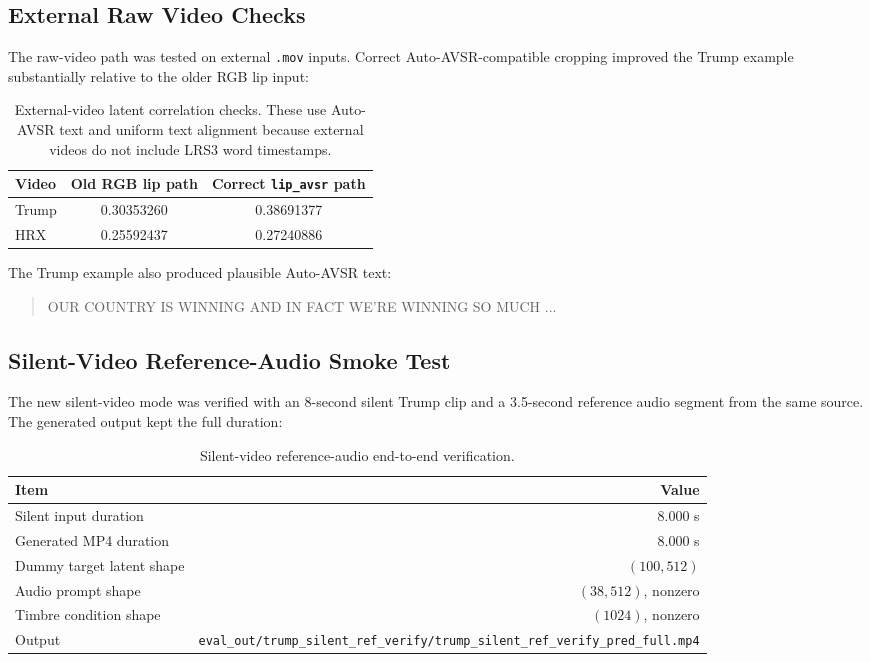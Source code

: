 \documentclass{article}
\begin{document}
\subsection{External Raw Video Checks}

The raw-video path was tested on external \texttt{.mov} inputs. Correct
Auto-AVSR-compatible cropping improved the Trump example substantially relative
to the older RGB lip input:
\begin{table}[h]
\centering
\small
\begin{tabular}{@{}lcc@{}}
\toprule
\textbf{Video} & \textbf{Old RGB lip path} & \textbf{Correct \texttt{lip\_avsr} path} \\
\midrule
Trump & 0.30353260 & 0.38691377 \\
HRX   & 0.25592437 & 0.27240886 \\
\bottomrule
\end{tabular}
\caption{External-video latent correlation checks. These use Auto-AVSR text and
uniform text alignment because external videos do not include LRS3 word
timestamps.}
\end{table}

The Trump example also produced plausible Auto-AVSR text:
\begin{quote}
\small
OUR COUNTRY IS WINNING AND IN FACT WE'RE WINNING SO MUCH ...
\end{quote}

\subsection{Silent-Video Reference-Audio Smoke Test}

The new silent-video mode was verified with an 8-second silent Trump clip and a
3.5-second reference audio segment from the same source. The generated output
kept the full duration:
\begin{table}[h]
\centering
\small
\begin{tabular}{@{}lr@{}}
\toprule
\textbf{Item} & \textbf{Value} \\
\midrule
Silent input duration & 8.000 s \\
Generated MP4 duration & 8.000 s \\
Dummy target latent shape & $(100,512)$ \\
Audio prompt shape & $(38,512)$, nonzero \\
Timbre condition shape & $(1024)$, nonzero \\
Output & \texttt{eval\_out/trump\_silent\_ref\_verify/trump\_silent\_ref\_verify\_pred\_full.mp4} \\
\bottomrule
\end{tabular}
\caption{Silent-video reference-audio end-to-end verification.}
\end{table}
\end{document}
